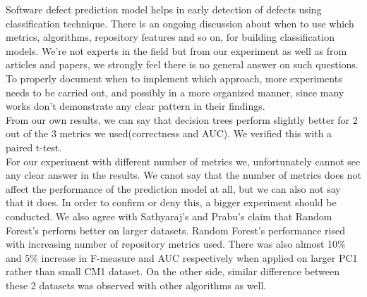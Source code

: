 Software defect prediction model helps in early detection of defects using classification technique. There is an ongoing discussion about when to use which metrics, algorithms, repository features and so on, for building classification models. We're not experts in the field but from our experiment as well as from articles and papers, we strongly feel there is no general answer on such questions. To properly document when to implement which approach, more experiments needs to be carried out, and possibly in a more organized manner, since many works don't demonstrate any clear pattern in their findings.\\
From our own results, we can say that decision trees perform slightly better for 2 out of the 3 metrics we used(correctness and AUC). We verified this with a paired t-test. \\ For our experiment with different number of metrics we, unfortunately cannot see any clear answer in the results. We canot say that the number of metrics does not affect the performance of the prediction model at all, but we can also not say that it does. In order to confirm or deny this, a bigger experiment should be conducted. 
We also agree with Sathyaraj's and Prabu's claim\cite{sathyaraj2015approach} that Random Forest's perform better on larger datasets. Random Forest's performance rised with increasing number of repository metrics used. There was also almost 10\% and 5\% increase in F-measure and AUC respectively when applied on larger PC1 rather than small CM1 dataset. On the other side, similar difference between these 2 datasets was observed with other algorithms as well.